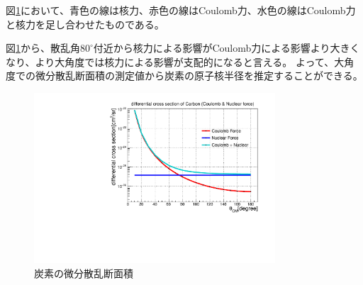 \documentclass[a4paper,11pt,dvipdfmx]{jsarticle}
\begin{document}
図\ref{fig:hikaku}において、青色の線は核力、赤色の線はCoulomb力、水色の線はCoulomb力と核力を足し合わせたものである。

図\ref{fig:hikaku}から、散乱角$80^{\circ}$付近から核力による影響がCoulomb力による影響より大きくなり、より大角度では核力による影響が支配的になると言える。
よって、大角度での微分散乱断面積の測定値から炭素の原子核半径を推定することができる。
\begin{figure}[htbp]
\centering
\includegraphics[width=9cm]{picture/radiustheory/kakutei.pdf}
\caption{炭素の微分散乱断面積}
\label{fig:hikaku}
\end{figure}
\end{document}
